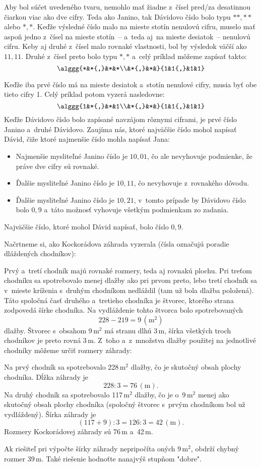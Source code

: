 {%
Aby bol súčet uvedeného tvaru, nemohlo mať žiadne z~čísel pred/za desatinnou čiarkou viac ako dve cifry.
Teda ako Janino, tak Dávidovo číslo bolo typu $**{,}**$ alebo $*{,}*$.
Keďže výsledné číslo malo na mieste stotín nenulovú cifru, muselo mať aspoň jedno z~čísel na mieste stotín~-- a~teda aj~na mieste desiatok~-- nenulovú cifru.
Keby aj druhé z~čísel malo rovnaké vlastnosti, bol by výsledok väčší ako $11{,}11$.
Druhé z~čísel preto bolo typu $*{,}*$ a~celý príklad môžeme zapísať takto:
$$
\alggg{*&*{,}&*&*\\&*{,}&*&}{1&1{,}&1&1}
$$

Keďže iba prvé číslo má na mieste desiatok a~stotín nenulové cifry, musia byť obe tieto cifry 1.
Celý príklad potom vyzerá nasledovne:
$$
\alggg{1&*{,}&*&1\\&*{,}&*&}{1&1{,}&1&1}
$$
Keďže Dávidovo číslo bolo zapísané navzájom rôznymi ciframi, je prvé číslo Janino a~druhé Dávidovo.
Zaujíma nás, ktoré najväčšie číslo mohol napísať Dávid, čiže ktoré najmenšie číslo mohla napísať Jana:
\begin{itemize}
\item Najmenšie mysliteľné Janino číslo je $10{,}01$, čo ale nevyhovuje podmienke, že práve dve cifry sú rovnaké.
\item Ďalšie mysliteľné Janino číslo je $10{,}11$, čo nevyhovuje z~rovnakého dôvodu.
\item Ďalšie mysliteľné Janino číslo je $10{,}21$, v~tomto prípade by Dávidovo číslo bolo $0{,}9$ a~táto možnosť vyhovuje všetkým podmienkam zo zadania.
\end{itemize}
Najväčšie číslo, ktoré mohol Dávid napísať, bolo číslo $0{,}9$.
}

{%
Načrtneme si, ako Kockorádova záhrada vyzerala (čísla označujú poradie dláždených chodníkov):
%


Prvý a~tretí chodník majú rovnaké rozmery, teda aj rovnakú plochu.
Pri treťom chodníku sa spotrebovalo menej dlažby ako pri prvom preto, lebo tretí chodník sa v~mieste kríženia s~druhým chodníkom nedláždil (tam už bola dlažba položená).
Táto spoločná časť druhého a~tretieho chodníka je štvorec, ktorého strana zodpovedá šírke chodníka.
Na vydláždenie tohto štvorca bolo spotrebovaných
$$
228-219=9\,(\text{m}^2)
$$
dlažby.
Štvorec s~obsahom 9\,m$^2$ má stranu dlhú 3\,m, šírka všetkých troch chodníkov je preto rovná 3\,m.
Z~toho a~z~množstva dlažby použitej na jednotlivé chodníky môžeme určiť rozmery záhrady:

Na prvý chodník sa spotrebovalo 228\,m$^2$ dlažby, čo je skutočný obsah plochy chodníka.
Dĺžka záhrady je
$$
228:3=76\,(\text{m}).
$$
Na druhý chodník sa spotrebovalo 117\,m$^2$ dlažby, čo je o~9\,m$^2$ menej ako skutočný obsah plochy chodníka (spoločný štvorec s~prvým chodníkom bol už vydláždený).
Šírka záhrady je
$$
(117+9):3=126:3=42\,(\text{m}).
$$
Rozmery Kockorádovej záhrady sú 76\,m a~42\,m.

\poznamka
Ak riešiteľ pri výpočte šírky záhrady nepripočíta oných 9\,m$^2$, obdrží chybný rozmer 39\,m.
Také riešenie hodnoťte nanajvýš stupňom "dobre".
}

